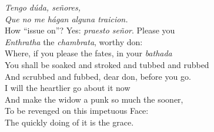 \documentclass[a4paper,oneside,12pt]{memoir}
\begin{document}
\begin{drama*}
\surlyspeaks {} \emph{Tengo d\'{u}da, se\~{n}ores,\\
Que no me h\'{a}gan alguna traicion.}\\
\subtlespeaks How ``issue on''? Yes: \emph{praesto se\~{n}or}. Please you\\
\emph{Enthratha} the \emph{chambrata}, worthy don:\\
Where, if you please the fates, in your \emph{bathada}\\
You shall be soaked and stroked and tubbed and rubbed\\
And scrubbed and fubbed, dear don, before you go.\\
I will the heartlier go about it now\\
And make the widow a punk so much the sooner,\\
To be revenged on this impetuous Face:\\
The quickly doing of it is the grace.\\

\scene


\end{drama*}
\end{document}
